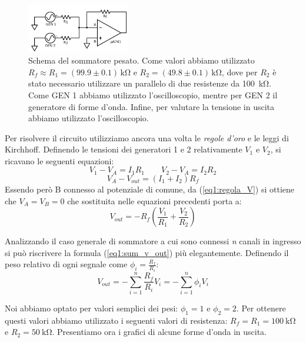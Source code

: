 \begin{figure}
  \begin{center}
    \includegraphics[width=0.40\textwidth]{../E01/latex/c2.pdf}
  \end{center}
  \caption{Schema del sommatore pesato. Come valori abbiamo utilizzato $R_f \approx R_1=(99.9 \pm 0.1)\,\si{\kilo\ohm}$ e $R_2=(49.8 \pm 0.1)\,\si{\kilo\ohm}$, dove per $R_2$ è stato necessario utilizzare un parallelo di due resistenze da \SI{100}{\kilo\ohm}. Come GEN 1 abbiamo utilizzato l'oscilloscopio, mentre per GEN 2 il generatore di forme d'onda. Infine, per valutare la tensione in uscita abbiamo utilizzato l'oscilloscopio.}
\label{cir1:sommatore_pesato}
\end{figure}

Per risolvere il circuito utilizziamo ancora una volta le \textit{regole d'oro} e le leggi di Kirchhoff. Definendo le tensioni dei generatori 1 e 2 relativamente $V_1$ e $V_2$, si ricavano le seguenti equazioni:
$$V_1 - V_A =I_1 R_1 \qquad V_2 - V_A =I_2 R_2$$
$$V_A - V_{out} =(I_1+I_2) R_f$$
Essendo però B connesso al potenziale di comune, da (\ref{eq1:regola_V}) si ottiene che $V_A = V_B = 0$ che sostituita nelle equazioni precedenti porta a:
\begin{equation}
V_{out}=-R_f \left( \frac{V_1}{R_1}+\frac{V_2}{R_2}\right)
\label{eq1:sum_v_out}
\end{equation}

Analizzando il caso generale di sommatore a cui sono connessi \textit{n} canali in ingresso si può riscrivere la formula (\ref{eq1:sum_v_out}) più elegantemente. Definendo il peso relativo di ogni segnale come $\phi_i = \frac{R_f}{R_i}$:
\begin{equation*}
V_{out}=-\sum^{n}_{i=1} \frac{R_f}{R_{i}}V_{i}=-\sum^{n}_{i=1} \phi_i V_{i}
\end{equation*}

Noi abbiamo optato per valori semplici dei pesi: $\phi_1=1$ e $\phi_2=2$. Per ottenere questi valori abbiamo utilizzato i seguenti valori di resistenza: $R_f=R_1=\SI{100}{\kilo\ohm}$ e $R_2=\SI{50}{\kilo\ohm}$.
Presentiamo ora i grafici di alcune forme d'onda in uscita.

